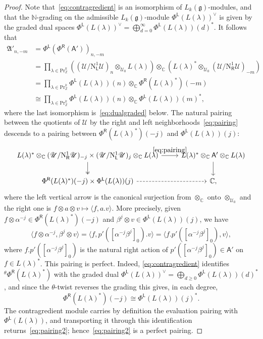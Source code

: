 \documentclass[12pt,a4paper,reqno]{amsart}
\numberwithin{equation}{section}
\theoremstyle{definition}
\newcommand{\g}{\mathfrak{g}}
\newcommand{\C}{\mathbb{C}}
\newcommand{\N}{\mathbb{N}}
\newcommand{\Z}{\mathbb{Z}}
\def\L{\mathsf{L}}
\def\R{\mathsf{R}}
\def\Pr{\mathrm{Pr}}
\def\la{\lambda}
\def \al{\alpha}
\def \b{\beta}
\def\o{\otimes}
\def\scrU{\mathscr{U}}
\def\fA{\mathfrak{A}}
\def\<{\langle}
\def\>{\rangle}
\def\rN{\mathrm{N}}
\def\A{\mathsf{A}}
\begin{document}
\begin{proof}
Note that~\eqref{eq:contragredient} is an isomorphism of $L_k(\g)$-modules, and that the $\N$-grading on the admissible $L_k(\g)$-module $\Phi^\L(L(\la))^\vee$ is given by the graded dual spaces $\Phi^\L(L(\la))^\vee=\bigoplus_{d=0}^\infty \Phi^\L(L(\la))(d)^\ast$.
It follows that
\begin{align*}
\fA'_{n,-m}&=\Phi^\L(\Phi^\R(\A'))_{n,-m}\\
&=\prod_{\la\in \Pr^k_\Z}\left((\scrU/\rN^1_\L\scrU)_n\o_{\scrU_0}L(\la)\right)\o_\C \left(L(\la)^\ast\o_{\scrU_0}(\scrU/\rN^1_\R\scrU)_{-m}\right)\\
&=\prod_{\la\in \Pr^k_\Z} \Phi^\L(L(\la))(n)\otimes_\C \Phi^\R(L(\la)^\ast)(-m)\\
&\cong \prod_{\la\in \Pr^k_\Z} \Phi^\L(L(\la))(n)\otimes_\C \Phi^\L(L(\la))(m)^\ast,
\end{align*}
where the last isomorphism is~\eqref{eq:dualgraded} below.
The natural pairing between the quotients of $\scrU$ by the right and left neighborhoods~\eqref{eq:pairing} descends to a pairing between $\Phi^\R(L(\la)^\ast)(-j)$ and $\Phi^\L(L(\la))(j)$:
\[
\begin{tikzcd}
L(\la)^\ast\o_\C (\scrU/\rN^1_\R\scrU)_{-j}\times (\scrU/\rN^1_\L\scrU)_j\o _\C L(\la)\arrow[r,"\eqref{eq:pairing}"]\arrow[d,two heads] & L(\la)^\ast\o_\C \A'\o_\C L(\la)\arrow[d]\\
\Phi^\R(L(\la)^\ast)(-j)\times \Phi^\L(L(\la))(j)\arrow[r,dashed]& \C,
\end{tikzcd}
\]
where the left vertical arrow is the canonical surjection from $\o_\C$ onto $\o_{\scrU_0}$ and the right one is $f\o a\o v\mapsto \<f,a.v\>$. More precisely, given $f\o \al^{-j}\in \Phi^\R(L(\la)^\ast)(-j)$ and $\b^j\o v\in \Phi^\L(L(\la))(j)$, we have
\begin{equation}\label{eq:pairing2}
\<f\o \al^{-j}, \b^j\o v\>=\<f,p'([\al^{-j}\b^j]_0).v\>=\<f.p'([\al^{-j}\b^j]_0),v\>,
\end{equation}
where $f.p'([\al^{-j}\b^j]_0)$ is the natural right action of $p'([\al^{-j}\b^j]_0)\in \A'$ on $f\in L(\la)^\ast$. 
This pairing is perfect. Indeed, \eqref{eq:contragredient} identifies ${}^\theta\Phi^\R(L(\la)^\ast)$ with the graded dual $\Phi^\L(L(\la))^\vee=\bigoplus_{d\geq 0}\Phi^\L(L(\la))(d)^\ast$, and since the $\theta$-twist reverses the grading this gives, in each degree,
\begin{equation}\label{eq:dualgraded}
\Phi^\R(L(\la)^\ast)(-j)\cong\Phi^\L(L(\la))(j)^\ast.
\end{equation}
The contragredient module carries by definition the evaluation pairing with $\Phi^\L(L(\la))$, and transporting it through this identification returns~\eqref{eq:pairing2}; hence~\eqref{eq:pairing2} is a perfect pairing.

\end{proof}
\end{document}
